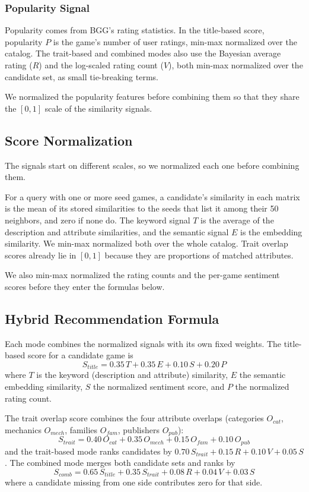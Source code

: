 \documentclass[conference]{IEEEtran}
\begin{document}
\subsubsection{Popularity Signal}

Popularity comes from BGG's rating statistics. In the title-based score, popularity $P$ is the game's number of user ratings, min-max normalized over the catalog. The trait-based and combined modes also use the Bayesian average rating ($R$) and the log-scaled rating count ($V$), both min-max normalized over the candidate set, as small tie-breaking terms.

We normalized the popularity features before combining them so that they share the $[0,1]$ scale of the similarity signals.

\subsection{Score Normalization}

The signals start on different scales, so we normalized each one before combining them.

For a query with one or more seed games, a candidate's similarity in each matrix is the mean of its stored similarities to the seeds that list it among their 50 neighbors, and zero if none do. The keyword signal $T$ is the average of the description and attribute similarities, and the semantic signal $E$ is the embedding similarity. We min-max normalized both over the whole catalog. Trait overlap scores already lie in $[0,1]$ because they are proportions of matched attributes.

We also min-max normalized the rating counts and the per-game sentiment scores before they enter the formulas below.

\subsection{Hybrid Recommendation Formula}

Each mode combines the normalized signals with its own fixed weights. The title-based score for a candidate game is
\begin{equation}
S_{title} = 0.35\,T + 0.35\,E + 0.10\,S + 0.20\,P
\end{equation}
where $T$ is the keyword (description and attribute) similarity, $E$ the semantic embedding similarity, $S$ the normalized sentiment score, and $P$ the normalized rating count.

The trait overlap score combines the four attribute overlaps (categories $O_{cat}$, mechanics $O_{mech}$, families $O_{fam}$, publishers $O_{pub}$):
\begin{equation}
S_{trait} = 0.40\,O_{cat} + 0.35\,O_{mech} + 0.15\,O_{fam} + 0.10\,O_{pub}
\end{equation}
and the trait-based mode ranks candidates by $0.70\,S_{trait} + 0.15\,R + 0.10\,V + 0.05\,S$. The combined mode merges both candidate sets and ranks by
\begin{equation}
S_{comb} = 0.65\,S_{title} + 0.35\,S_{trait} + 0.08\,R + 0.04\,V + 0.03\,S
\end{equation}
where a candidate missing from one side contributes zero for that side.
\end{document}
